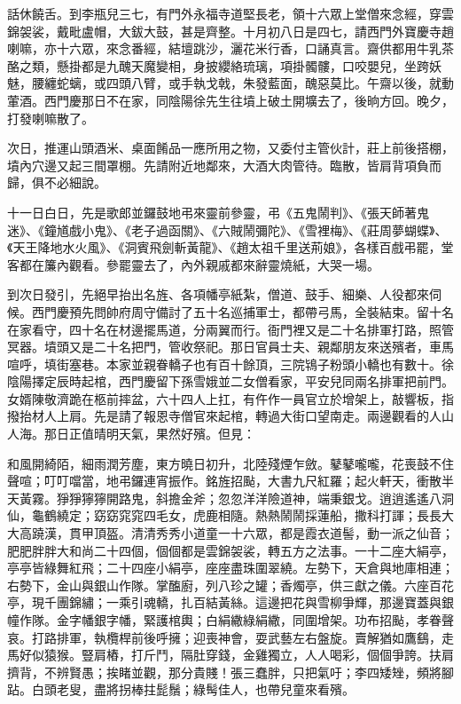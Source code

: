 話休饒舌。到李瓶兒三七，有門外永福寺道堅長老，領十六眾上堂僧來念經，穿雲錦袈裟，戴毗盧帽，大鈸大鼓，甚是齊整。十月初八日是四七，請西門外寶慶寺趙喇嘛，亦十六眾，來念番經，結壇跳沙，灑花米行香，口誦真言。齋供都用牛乳茶酪之類，懸掛都是九醜天魔變相，身披纓絡琉璃，項掛髑髏，口咬嬰兒，坐跨妖魅，腰纏蛇螭，或四頭八臂，或手執戈戟，朱發藍面，醜惡莫比。午齋以後，就動葷酒。西門慶那日不在家，同陰陽徐先生往墳上破土開壙去了，後晌方回。晚夕，打發喇嘛散了。

次日，推運山頭酒米、桌面餚品一應所用之物，又委付主管伙計，莊上前後搭棚，墳內穴邊又起三間罩棚。先請附近地鄰來，大酒大肉管待。臨散，皆肩背項負而歸，俱不必細說。

十一日白日，先是歌郎並鑼鼓地弔來靈前參靈，弔《五鬼鬧判》、《張天師著鬼迷》、《鐘馗戲小鬼》、《老子過函關》、《六賊鬧彌陀》、《雪裡梅》、《莊周夢蝴蝶》、《天王降地水火風》、《洞賓飛劍斬黃龍》、《趙太祖千里送荊娘》，各樣百戲弔罷，堂客都在簾內觀看。參罷靈去了，內外親戚都來辭靈燒紙，大哭一場。

到次日發引，先絕早抬出名旌、各項幡亭紙紮，僧道、鼓手、細樂、人役都來伺候。西門慶預先問帥府周守備討了五十名巡捕軍士，都帶弓馬，全裝結束。留十名在家看守，四十名在材邊擺馬道，分兩翼而行。衙門裡又是二十名排軍打路，照管冥器。墳頭又是二十名把門，管收祭祀。那日官員士夫、親鄰朋友來送殯者，車馬喧呼，填街塞巷。本家並親眷轎子也有百十餘頂，三院鴇子粉頭小轎也有數十。徐陰陽擇定辰時起棺，西門慶留下孫雪娥並二女僧看家，平安兒同兩名排軍把前門。女婿陳敬濟跪在柩前摔盆，六十四人上扛，有仵作一員官立於增架上，敲響板，指撥抬材人上肩。先是請了報恩寺僧官來起棺，轉過大街口望南走。兩邊觀看的人山人海。那日正值晴明天氣，果然好殯。但見：

和風開綺陌，細雨潤芳塵，東方曉日初升，北陸殘煙乍斂。鼕鼕嚨嚨，花喪鼓不住聲喧；叮叮噹當，地弔鑼連宵振作。銘旌招颭，大書九尺紅羅；起火軒天，衝散半天黃霧。猙猙獰獰開路鬼，斜擔金斧；忽忽洋洋險道神，端秉銀戈。逍逍遙遙八洞仙，龜鶴繞定；窈窈窕窕四毛女，虎鹿相隨。熱熱鬧鬧採蓮船，撒科打諢；長長大大高蹺漢，貫甲頂盔。清清秀秀小道童一十六眾，都是霞衣道髻，動一派之仙音；肥肥胖胖大和尚二十四個，個個都是雲錦袈裟，轉五方之法事。一十二座大絹亭，亭亭皆綠舞紅飛；二十四座小絹亭，座座盡珠圍翠繞。左勢下，天倉與地庫相連；右勢下，金山與銀山作隊。掌醢廚，列八珍之罐；香燭亭，供三獻之儀。六座百花亭，現千團錦繡；一乘引魂轎，扎百結黃絲。這邊把花與雪柳爭輝，那邊寶蓋與銀幢作隊。金字幡銀字幡，緊護棺輿；白絹繖綠絹繖，同圍增架。功布招颭，孝眷聲哀。打路排軍，執欖桿前後呼擁；迎喪神會，耍武藝左右盤旋。賣解猶如鷹鷂，走馬好似猿猴。豎肩樁，打斤鬥，隔肚穿錢，金雞獨立，人人喝彩，個個爭誇。扶肩擠背，不辨賢愚；挨睹並觀，那分貴賤！張三蠢胖，只把氣吁；李四矮矬，頻將腳跕。白頭老叟，盡將拐棒拄髭鬚；綠髩佳人，也帶兒童來看殯。

